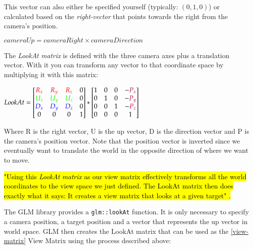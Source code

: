 
This vector can also either be specified yourself (typically: $(0, 1, 0)$) or calculated based on the \emph{right-vector} that points towards the right from the camera's position. 

\centerline{$cameraUp = cameraRight \times cameraDirection$}


The \emph{LookAt matrix} is defined with the three camera axes plus a translation vector. With it you can transform any vector to that coordinate space by multiplying it with this matrix:

\centerline{
$LookAt = 
\begin{bmatrix} \color{red}{R_x} & \color{red}{R_y} & \color{red}{R_z} & 0 \\ 
				\color{green}{U_x} & \color{green}{U_y} & \color{green}{U_z} & 0 \\ 
				\color{blue}{D_x} & \color{blue}{D_y} & \color{blue}{D_z} & 0 \\ 
				0 & 0 & 0  & 1 \end{bmatrix} 
				* \begin{bmatrix} 1 & 0 & 0 & -\color{purple}{P_x} \\ 
				0 & 1 & 0 & -\color{purple}{P_y} \\ 
				0 & 0 & 1 & -\color{purple}{P_z} \\ 
				0 & 0 & 0  & 1 \end{bmatrix}$ }

Where {\color{red}R} is the right vector, {\color{green}U} is the up vector, {\color{blue}D} is the direction vector and {\color{purple}P} is the camera's position vector. Note that the position vector is inverted since we eventually want to translate the world in the opposite direction of where we want to move. 


\hl{"Using this \emph{LookAt matrix} as our view matrix effectively transforms all the world coordinates to the view space we just defined. The LookAt matrix then does exactly what it says: It creates a view matrix that looks at a given target" \cite{cameraopengl}.}

The GLM library \cite{glm} provides a \verb|glm::lookAt| function. It is only necessary to specify a camera position, a target position and a vector that represents the up vector in world space. GLM then creates the LookAt matrix that can be used as the \ref{view-matrix} View Matrix using the process described above:


